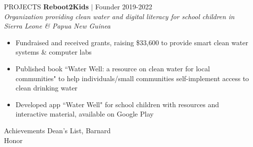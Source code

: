 \documentclass{resume} %
\begin{document}
\begin{rSection}{PROJECTS}
{ \textbf{Reboot2Kids} $\vert$ Founder} \hfill 2019-2022\\ 
\textit{Organization providing clean water and digital literacy for school children in Sierra Leone \& Papua New Guinea}
\vspace{-0.6em}
\begin{itemize}
\item Fundraised and received grants, raising \$33,600 to provide smart clean water systems \& computer labs
\vspace{-0.4em}
\item Published book ``Water Well: a resource on clean water for local communities" to help individuals/small communities self-implement access to clean drinking water
\vspace{-0.4em}
\item Developed app ``Water Well" for school children with resources and interactive material, available on Google Play
\end{itemize}

\end{rSection}

\vspace{-0.2em}

\begin{rSection}{Achievements}
{Dean's List, Barnard}\\ 
{Honor}\\ 
\end{rSection}

\end{document}

